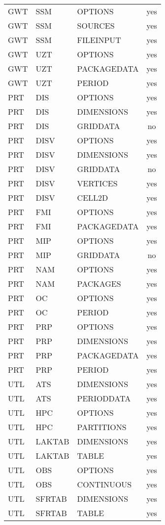\begin{longtable}{p{1.5cm} p{1.5cm} p{3cm} c}
\hline
GWT & SSM & OPTIONS & yes \\ 
GWT & SSM & SOURCES & yes \\ 
GWT & SSM & FILEINPUT & yes \\ 
\hline
GWT & UZT & OPTIONS & yes \\ 
GWT & UZT & PACKAGEDATA & yes \\ 
GWT & UZT & PERIOD & yes \\ 
\hline
PRT & DIS & OPTIONS & yes \\ 
PRT & DIS & DIMENSIONS & yes \\ 
PRT & DIS & GRIDDATA & no \\ 
\hline
PRT & DISV & OPTIONS & yes \\ 
PRT & DISV & DIMENSIONS & yes \\ 
PRT & DISV & GRIDDATA & no \\ 
PRT & DISV & VERTICES & yes \\ 
PRT & DISV & CELL2D & yes \\ 
\hline
PRT & FMI & OPTIONS & yes \\ 
PRT & FMI & PACKAGEDATA & yes \\ 
\hline
PRT & MIP & OPTIONS & yes \\ 
PRT & MIP & GRIDDATA & no \\ 
\hline
PRT & NAM & OPTIONS & yes \\ 
PRT & NAM & PACKAGES & yes \\ 
\hline
PRT & OC & OPTIONS & yes \\ 
PRT & OC & PERIOD & yes \\ 
\hline
PRT & PRP & OPTIONS & yes \\ 
PRT & PRP & DIMENSIONS & yes \\ 
PRT & PRP & PACKAGEDATA & yes \\ 
PRT & PRP & PERIOD & yes \\ 
\hline
UTL & ATS & DIMENSIONS & yes \\ 
UTL & ATS & PERIODDATA & yes \\ 
\hline
UTL & HPC & OPTIONS & yes \\ 
UTL & HPC & PARTITIONS & yes \\ 
\hline
UTL & LAKTAB & DIMENSIONS & yes \\ 
UTL & LAKTAB & TABLE & yes \\ 
\hline
UTL & OBS & OPTIONS & yes \\ 
UTL & OBS & CONTINUOUS & yes \\ 
\hline
UTL & SFRTAB & DIMENSIONS & yes \\ 
UTL & SFRTAB & TABLE & yes \\ 

\end{longtable}
